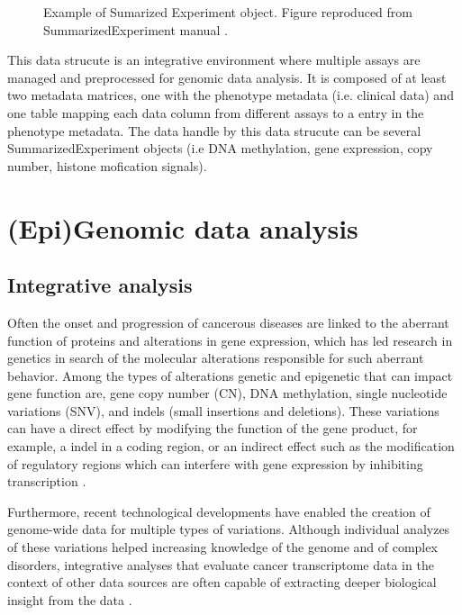 \begin{description}
\begin{figure}[ht!]
  \caption[Sumarized Experiment object]{\label{fig:SE} Example of Sumarized Experiment object. Figure reproduced from SummarizedExperiment manual \cite{SummarizedExperiment}.}
  \end{figure}
  \item [\sigla{MAE}{MultiAssayExperiment}:] This data strucute is an integrative environment where multiple assays are managed and preprocessed for genomic data analysis.  It is composed of at least two metadata matrices, one with the phenotype metadata (i.e. clinical data) and one table mapping each data column from different assays to a entry in the phenotype metadata. The data handle by this data strucute can be several SummarizedExperiment objects (i.e DNA methylation, gene expression, copy number, histone mofication signals).

\end{description}





\section{(Epi)Genomic data analysis} \label{sec:concept-analysis}

\subsection{Integrative analysis}
Often the onset and progression of cancerous diseases are
linked to the aberrant function of proteins and alterations in gene expression,
which has led research in genetics in search of the molecular alterations responsible for such aberrant behavior.
Among the types of alterations genetic and epigenetic
that can impact gene function are, gene copy number
(CN), DNA methylation, single nucleotide variations (SNV), and indels (small insertions and
deletions).
These variations can have a direct effect by modifying
 the function of the gene product, for example, a
indel in a coding region, or an indirect effect such as
the modification of  regulatory regions which can interfere
 with gene expression by inhibiting transcription \cite{thingholm2016strategies}.

Furthermore, recent technological developments have enabled the creation of genome-wide data for multiple types of variations.
Although individual analyzes of these variations helped  increasing knowledge of the genome and of complex
disorders, integrative analyses that evaluate cancer transcriptome data in the context of other data sources are often capable of extracting deeper biological insight from the data \cite{rhodes2005integrative}.

